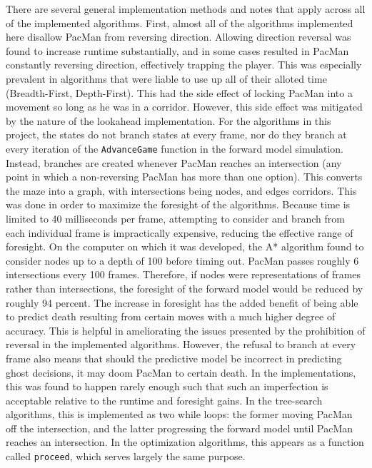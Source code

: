 \documentclass[a4paper]{article}
\begin{document}
There are several general implementation methods and notes that apply across all of the implemented algorithms.
\newline
First, almost all of the algorithms implemented here disallow PacMan from reversing direction.  Allowing direction reversal was found to increase runtime substantially, and in some cases resulted in PacMan constantly reversing direction, effectively trapping the player. This was especially prevalent in algorithms that were liable to use up all of their alloted time (Breadth-First, Depth-First). This had the side effect of locking PacMan into a movement so long as he was in a corridor. However, this side effect was mitigated by the nature of the lookahead implementation.
\newline
For the algorithms in this project, the states do not branch states at every frame, nor do they branch at every iteration of the \texttt{AdvanceGame} function in the forward model simulation.  Instead, branches are created whenever PacMan reaches an intersection (any point in which a non-reversing PacMan has more than one option).  This converts the maze into a graph, with intersections being nodes, and edges corridors.  This was done in order to maximize the foresight of the algorithms.  Because time is limited to 40 milliseconds per frame, attempting to consider and branch from each individual frame is impractically expensive, reducing the effective range of foresight.  On the computer on which it was developed, the A* algorithm found to consider nodes up to a depth of 100 before timing out.  PacMan passes roughly 6 intersections every 100 frames.  Therefore, if nodes were representations of frames rather than intersections, the foresight of the forward model would be reduced by roughly 94 percent.  The increase in foresight has the added benefit of being able to predict death resulting from certain moves with a much higher degree of accuracy.  This is helpful in ameliorating the issues presented by the prohibition of reversal in the implemented algorithms.  However, the refusal to branch at every frame also means that should the predictive model be incorrect in predicting ghost decisions, it may doom PacMan to certain death.  In the implementations, this was found to happen rarely enough such that such an imperfection is acceptable relative to the runtime and foresight gains.  In the tree-search algorithms, this is implemented as two while loops: the former moving PacMan off the intersection, and the latter progressing the forward model until PacMan reaches an intersection.  In the optimization algorithms, this appears as a function called \texttt{proceed}, which serves largely the same purpose.
\end{document}
